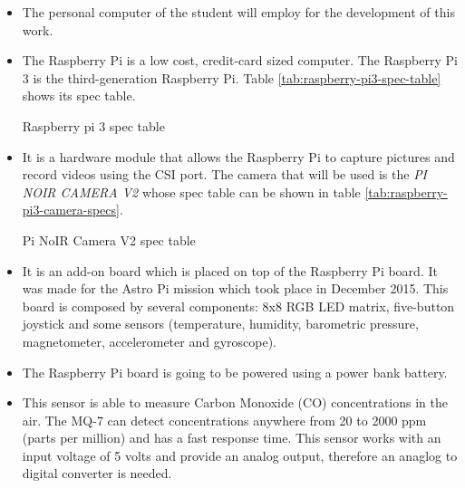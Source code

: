 \documentclass{pre-tfg}
\begin{document}
\begin{itemize}[noitemsep,nolistsep]
	\item {} The personal computer of the student will employ for the development of this work.
	
	\item {} The Raspberry Pi is a low cost, credit-card sized computer. The Raspberry Pi 3 is the third-generation Raspberry Pi. Table \ref{tab:raspberry-pi3-spec-table} shows its spec table.
	
	\begin{table}[!h]
		\centering
		{\small
			
		}
		\caption{Raspberry pi 3 spec table}
		\label{tab:raspberry-pi3-spec-table}
	\end{table}
	
	\item {} It is a hardware module that allows the Raspberry Pi to capture pictures and record videos using the CSI port. The camera that will be used is the \emph{PI NOIR CAMERA V2} whose spec table can be shown in table \ref{tab:raspberry-pi3-camera-specs}. \label{itm:Pi-camera-module-v2}
	
	\begin{table}[!h]
		\centering
		{\small
			
		}
		\caption{Pi NoIR Camera V2 spec table}
		\label{tab:raspberry-pi3-camera-specs}
	\end{table}
	
	\item {} It is an add-on board which is placed on top of the Raspberry Pi board. It was made for the Astro Pi mission which took place in December 2015. This board is composed by several components: 8x8 RGB LED matrix, five-button joystick and some sensors (temperature, humidity, barometric pressure, magnetometer, accelerometer and gyroscope).
	
	\item {} The Raspberry Pi board is going to be powered using a power bank battery.
	
	\item {} This sensor is able to measure Carbon Monoxide (CO) concentrations in the air. The MQ-7 can detect concentrations anywhere from 20 to 2000 ppm (parts per million) and has a fast response time. This sensor works with an input voltage of 5 volts and provide an analog output, therefore an anaglog to digital converter is needed.
	

\end{itemize}
\end{document}
